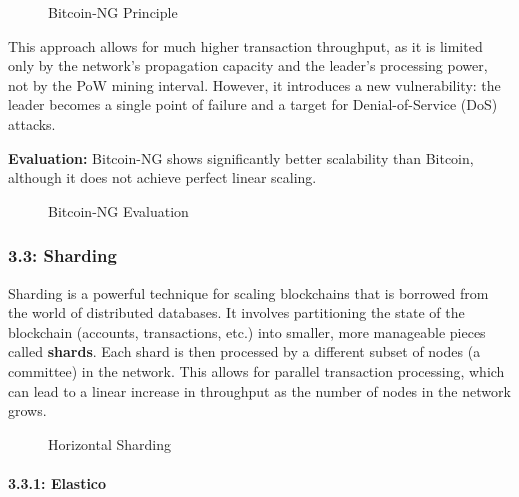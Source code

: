 \begin{figure}
\centering
\caption{Bitcoin-NG Principle}
\end{figure}

This approach allows for much higher transaction throughput, as it is
limited only by the network's propagation capacity and the leader's
processing power, not by the PoW mining interval. However, it introduces
a new vulnerability: the leader becomes a single point of failure and a
target for Denial-of-Service (DoS) attacks.

\textbf{Evaluation:} Bitcoin-NG shows significantly better scalability
than Bitcoin, although it does not achieve perfect linear scaling.

\begin{figure}
\centering
\caption{Bitcoin-NG Evaluation}
\end{figure}

\subsubsection{3.3: Sharding}\label{sharding}

Sharding is a powerful technique for scaling blockchains that is
borrowed from the world of distributed databases. It involves
partitioning the state of the blockchain (accounts, transactions, etc.)
into smaller, more manageable pieces called \textbf{shards}. Each shard
is then processed by a different subset of nodes (a committee) in the
network. This allows for parallel transaction processing, which can lead
to a linear increase in throughput as the number of nodes in the network
grows.

\begin{figure}
\centering
\caption{Horizontal Sharding}
\end{figure}

\paragraph{3.3.1: Elastico}\label{elastico}

